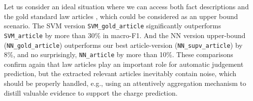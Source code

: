 Let us consider an ideal situation where we can access both fact descriptions and the gold standard law articles , which could be considered as an upper bound scenario.
The SVM version \texttt{SVM\_gold\_article} significantly outperforms %
\texttt{SVM\_article} by more than 30\% in macro-F1.
And the NN version upper-bound (\texttt{NN\_gold\_article}) outperforms 
our best article-version (\texttt{NN\_supv\_article}) by  8\%, and no surprisingly, \texttt{NN\_article} by more than 10\%.
%
These comparisons confirm again that 
law articles play an important role for automatic judgement prediction, but 
the extracted relevant articles inevitably contain noise, which should be properly 
handled, e.g., using an attentively aggregation mechanism to distill 
valuable evidence to support the charge prediction.






